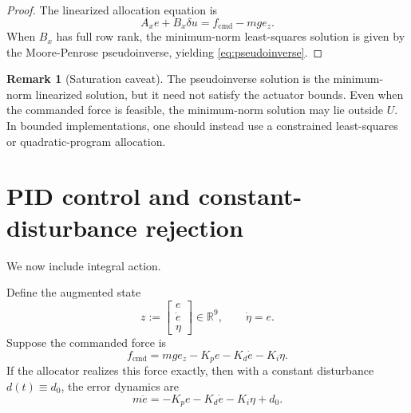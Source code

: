 \documentclass[11pt]{article}
\theoremstyle{definition}
\newtheorem{remark}{Remark}
\begin{document}
\begin{proof}
The linearized allocation equation is
\[
A_x e + B_x \delta u = f_{\mathrm{cmd}} - mg e_z.
\]
When $B_x$ has full row rank, the minimum-norm least-squares solution is given by the Moore-Penrose pseudoinverse, yielding \eqref{eq:pseudoinverse}.
\end{proof}

\begin{remark}[Saturation caveat]
The pseudoinverse solution is the minimum-norm linearized solution, but it need not satisfy the actuator bounds. Even when the commanded force is feasible, the minimum-norm solution may lie outside $U$. In bounded implementations, one should instead use a constrained least-squares or quadratic-program allocation.
\end{remark}

\section{PID control and constant-disturbance rejection}

We now include integral action.

Define the augmented state
\[
z := \begin{bmatrix} e \\ \dot e \\ \eta \end{bmatrix} \in \mathbb{R}^9,
\qquad
\dot \eta = e.
\]
Suppose the commanded force is
\[
f_{\mathrm{cmd}} = mg e_z - K_p e - K_d \dot e - K_i \eta.
\]
If the allocator realizes this force exactly, then with a constant disturbance $d(t) \equiv d_0$, the error dynamics are
\begin{equation}
 m\ddot e = -K_p e - K_d \dot e - K_i \eta + d_0.
 \label{eq:piddyn}
\end{equation}
\end{document}
